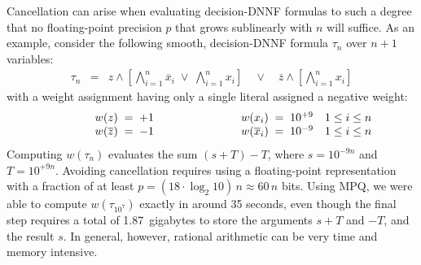 \documentclass[letterpaper,USenglish,cleveref, autoref, thm-restate]{lipics-v2021}
\newcommand{\obar}[1]{\overline{#1}}
\begin{document}
Cancellation can arise when evaluating decision-DNNF formulas to such a degree that no floating-point precision $p$ that grows sublinearly with $n$ will suffice.
As an example, consider the following smooth, decision-DNNF formula $\tau_n$ over $n+1$ variables:
\begin{eqnarray}
\tau_n  & = & z \land \left[\bigwedge_{i = 1}^{n} \obar{x}_i \; \lor \; \bigwedge_{i = 1}^{n} x_i\right] \quad \lor \quad \obar{z} \land \left [\bigwedge_{i = 1}^{n} x_i\right] \label{eqn:max:precision}
\end{eqnarray}
with a weight assignment having only a single literal assigned a negative weight:
\begin{displaymath}
\begin{array}{lllll}
\makebox[1cm]{} &  w(z) \; = \; +1 & \makebox[2cm]{} &  w(x_i) \; = \; 10^{+9} & 1 \leq i \leq n \\
\makebox[1cm]{} &  w(\obar{z}) \; = \; -1 & &  w(\obar{x}_i) \; = \; 10^{-9} & 1 \leq i \leq n \\
\end{array}
\end{displaymath}
Computing $w(\tau_n)$  evaluates the sum $(s + T) - T$, where
$s = 10^{-9n}$ and $T = 10^{+9n}$.  Avoiding cancellation requires using a floating-point representation with a fraction of at least
$p = (18 \cdot \log_2 10)\, n \approx 60 \, n$ bits.
Using MPQ, we were able to compute $w(\tau_{10^7})$ exactly in around 35 seconds, even though the final step requires a total of 1.87~gigabytes to store the arguments
$s+T$ and $-T$, and the result $s$.  In general, however, rational arithmetic can be very time and memory intensive.
\end{document}

